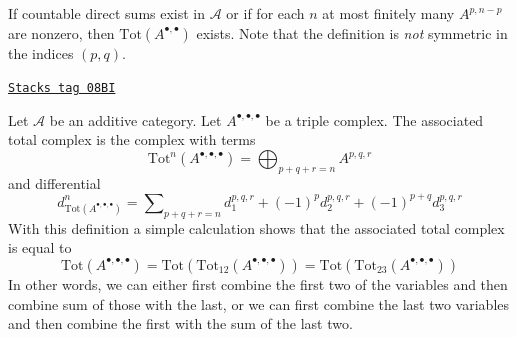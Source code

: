 If countable direct sums exist in $\mathcal{A}$ or if for each $n$ at most
finitely many $A^{p, n - p}$ are nonzero, then
$\text{Tot}(A^{\bullet, \bullet})$ exists. Note that
the definition is {\it not} symmetric in the indices $(p, q)$.

\begin{remark}
\label{homology-remark-triple-complex}
\href{https://stacks.math.columbia.edu/tag/08BI}{\texttt{Stacks tag 08BI}}

Let $\mathcal{A}$ be an additive category. Let $A^{\bullet, \bullet, \bullet}$
be a triple complex. The associated total complex is the complex with
terms
$$
\text{Tot}^n(A^{\bullet, \bullet, \bullet}) =
\bigoplus\nolimits_{p + q + r = n} A^{p, q, r}
$$
and differential
$$
d^n_{\text{Tot}(A^{\bullet, \bullet, \bullet})} =
\sum\nolimits_{p + q + r = n}
d_1^{p, q, r} + (-1)^pd_2^{p, q, r} + (-1)^{p + q}d_3^{p, q, r}
$$
With this definition a simple calculation shows that the associated total
complex is equal to
$$
\text{Tot}(A^{\bullet, \bullet, \bullet}) =
\text{Tot}(\text{Tot}_{12}(A^{\bullet, \bullet, \bullet})) =
\text{Tot}(\text{Tot}_{23}(A^{\bullet, \bullet, \bullet}))
$$
In other words, we can either first combine the first two of the variables
and then combine sum of those with the last, or we can first combine the
last two variables and then combine the first with the sum of the last two.
\end{remark}

